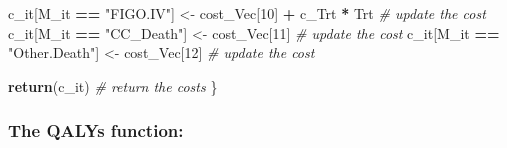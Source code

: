 \documentclass[
]{article}
\newenvironment{Shaded}{\begin{snugshade}}{\end{snugshade}}
\newcommand{\CommentTok}[1]{\textcolor[rgb]{0.56,0.35,0.01}{\textit{#1}}}
\newcommand{\DecValTok}[1]{\textcolor[rgb]{0.00,0.00,0.81}{#1}}
\newcommand{\FunctionTok}[1]{\textcolor[rgb]{0.13,0.29,0.53}{\textbf{#1}}}
\newcommand{\NormalTok}[1]{#1}
\newcommand{\OtherTok}[1]{\textcolor[rgb]{0.56,0.35,0.01}{#1}}
\newcommand{\SpecialCharTok}[1]{\textcolor[rgb]{0.81,0.36,0.00}{\textbf{#1}}}
\newcommand{\StringTok}[1]{\textcolor[rgb]{0.31,0.60,0.02}{#1}}
\begin{document}
\begin{Shaded}
\begin{Highlighting}[]
\NormalTok{    c\_it[M\_it }\SpecialCharTok{==} \StringTok{"FIGO.IV"}\NormalTok{] }\OtherTok{\textless{}{-}}\NormalTok{ cost\_Vec[}\DecValTok{10}\NormalTok{] }\SpecialCharTok{+}\NormalTok{ c\_Trt }\SpecialCharTok{*}\NormalTok{ Trt  }\CommentTok{\# update the cost }
\NormalTok{    c\_it[M\_it }\SpecialCharTok{==} \StringTok{"CC\_Death"}\NormalTok{] }\OtherTok{\textless{}{-}}\NormalTok{ cost\_Vec[}\DecValTok{11}\NormalTok{]  }\CommentTok{\# update the cost }
\NormalTok{    c\_it[M\_it }\SpecialCharTok{==} \StringTok{"Other.Death"}\NormalTok{] }\OtherTok{\textless{}{-}}\NormalTok{ cost\_Vec[}\DecValTok{12}\NormalTok{]  }\CommentTok{\# update the cost }

    \FunctionTok{return}\NormalTok{(c\_it)  }\CommentTok{\# return the costs}
\NormalTok{\}}
\end{Highlighting}
\end{Shaded}

\hypertarget{the-qalys-function}{%
\subsubsection{The QALYs function:}\label{the-qalys-function}}
\end{document}
